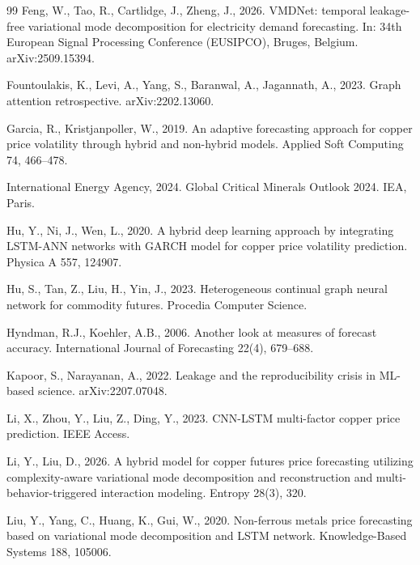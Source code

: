 \documentclass[journal]{IEEEtran}
\begin{document}
\begin{thebibliography}{99}
Feng, W., Tao, R., Cartlidge, J., Zheng, J., 2026. VMDNet: temporal leakage-free variational mode decomposition for electricity demand forecasting. In: 34th European Signal Processing Conference (EUSIPCO), Bruges, Belgium. arXiv:2509.15394.

Fountoulakis, K., Levi, A., Yang, S., Baranwal, A., Jagannath, A., 2023. Graph attention retrospective. arXiv:2202.13060.

Garcia, R., Kristjanpoller, W., 2019. An adaptive forecasting approach for copper price volatility through hybrid and non-hybrid models. Applied Soft Computing 74, 466--478.

International Energy Agency, 2024. Global Critical Minerals Outlook 2024. IEA, Paris.

Hu, Y., Ni, J., Wen, L., 2020. A hybrid deep learning approach by integrating LSTM-ANN networks with GARCH model for copper price volatility prediction. Physica A 557, 124907.

Hu, S., Tan, Z., Liu, H., Yin, J., 2023. Heterogeneous continual graph neural network for commodity futures. Procedia Computer Science.

Hyndman, R.J., Koehler, A.B., 2006. Another look at measures of forecast accuracy. International Journal of Forecasting 22(4), 679--688.

Kapoor, S., Narayanan, A., 2022. Leakage and the reproducibility crisis in ML-based science. arXiv:2207.07048.

Li, X., Zhou, Y., Liu, Z., Ding, Y., 2023. CNN-LSTM multi-factor copper price prediction. IEEE Access.

Li, Y., Liu, D., 2026. A hybrid model for copper futures price forecasting utilizing complexity-aware variational mode decomposition and reconstruction and multi-behavior-triggered interaction modeling. Entropy 28(3), 320.

Liu, Y., Yang, C., Huang, K., Gui, W., 2020. Non-ferrous metals price forecasting based on variational mode decomposition and LSTM network. Knowledge-Based Systems 188, 105006.


\end{thebibliography}
\end{document}
